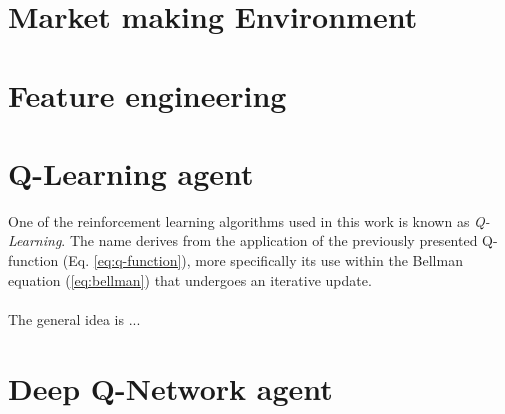 \section{Market making Environment}

\section{Feature engineering}
\label{sec:feature-engineering}


\section{Q-Learning agent}

One of the reinforcement learning algorithms used in this work is known as \textit{Q-Learning}. 
The name derives from the application of the previously presented Q-function (Eq. \ref{eq:q-function}), more specifically its use within the Bellman equation (\ref{eq:bellman}) that undergoes an iterative update.
\\
\\
The general idea is ... 

\section{Deep Q-Network agent}
